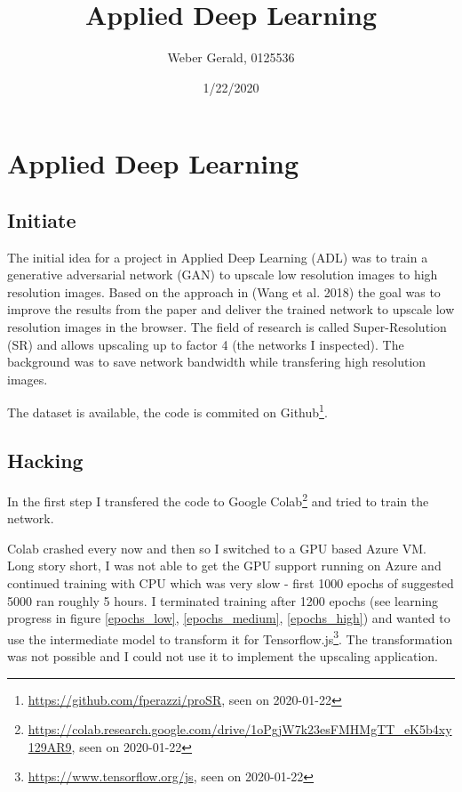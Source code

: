 \documentclass[]{article}
\title{Applied Deep Learning}
\author{Weber Gerald, 0125536}
\date{1/22/2020}
\let\rmarkdownfootnote\footnote%
\def\footnote{\protect\rmarkdownfootnote}
\begin{document}
\maketitle

\hypertarget{applied-deep-learning}{%
\section{Applied Deep Learning}\label{applied-deep-learning}}

\hypertarget{initiate}{%
\subsection{Initiate}\label{initiate}}

The initial idea for a project in Applied Deep Learning (ADL) was to
train a generative adversarial network (GAN) to upscale low resolution
images to high resolution images. Based on the approach in (Wang et al.
2018) the goal was to improve the results from the paper and deliver the
trained network to upscale low resolution images in the browser. The
field of research is called Super-Resolution (SR) and allows upscaling
up to factor 4 (the networks I inspected). The background was to save
network bandwidth while transfering high resolution images.

The dataset is available, the code is commited on
Github\footnote{\url{https://github.com/fperazzi/proSR}, seen on 2020-01-22}.

\hypertarget{hacking}{%
\subsection{Hacking}\label{hacking}}

In the first step I transfered the code to Google
Colab\footnote{\url{https://colab.research.google.com/drive/1oPgjW7k23esFMHMgTT_eK5b4xy129AR9}, seen on 2020-01-22}
and tried to train the network.

Colab crashed every now and then so I switched to a GPU based Azure VM.
Long story short, I was not able to get the GPU support running on Azure
and continued training with CPU which was very slow - first 1000 epochs
of suggested 5000 ran roughly 5 hours. I terminated training after 1200
epochs (see learning progress in figure \ref{epochs_low},
\ref{epochs_medium}, \ref{epochs_high}) and wanted to use the
intermediate model to transform it for
Tensorflow.js\footnote{\url{https://www.tensorflow.org/js}, seen on 2020-01-22}.
The transformation was not possible and I could not use it to implement
the upscaling application.
\end{document}
